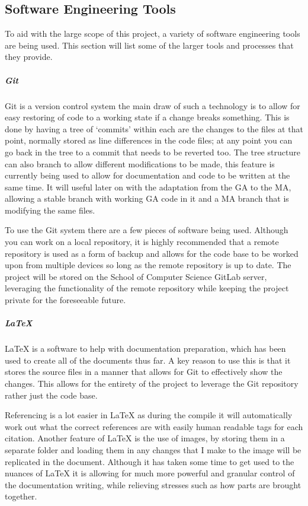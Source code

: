 \documentclass[a4paper]{article}
\begin{document}
\subsection{Software Engineering Tools}
\par
To aid with the large scope of this project, a variety of software engineering tools are being used.
This section will list some of the larger tools and processes that they provide.
\subparagraph{Git}
Git is a version control system the main draw of such a technology is to allow for easy restoring of code to a working state if a change breaks something.
This is done by having a tree of `commits' within each are the changes to the files at that point, normally stored as line differences in the code files; at any point you can go back in the tree to a commit that needs to be reverted too.
The tree structure can also branch to allow different modifications to be made, this feature is currently being used to allow for documentation and code to be written at the same time.
It will useful later on with the adaptation from the GA to the MA, allowing a stable branch with working GA code in it and a MA branch that is modifying the same files.
\par
To use the Git system there are a few pieces of software being used.
Although you can work on a local repository, it is highly recommended that a remote repository is used as a form of backup and allows for the code base to be worked upon from multiple devices so long as the remote repository is up to date.
The project will be stored on the School of Computer Science GitLab server, leveraging the functionality of the remote repository while keeping the project private for the foreseeable future.
\subparagraph{LaTeX}
LaTeX is a software to help with documentation preparation, which has been used to create all of the documents thus far.
A key reason to use this is that it stores the source files in a manner that allows for Git to effectively show the changes.
This allows for the entirety of the project to leverage the Git repository rather just the code base.
\par
Referencing is a lot easier in LaTeX as during the compile it will automatically work out what the correct references are with easily human readable tags for each citation.
Another feature of LaTeX is the use of images, by storing them in a separate folder and loading them in any changes that I make to the image will be replicated in the document.
Although it has taken some time to get used to the nuances of LaTeX it is allowing for much more powerful and granular control of the documentation writing, while relieving stresses such as how parts are brought together.
\end{document}
